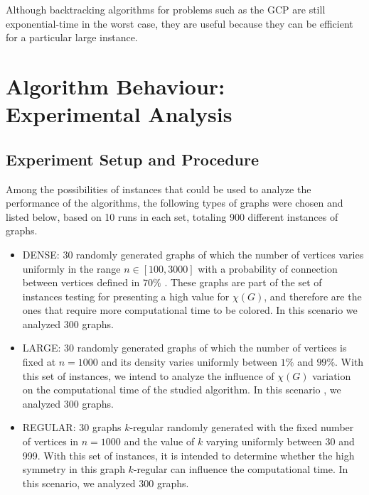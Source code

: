 \documentclass{article}
\begin{document}
Although backtracking algorithms for problems such as the GCP are still exponential-time in the worst case, they are useful because they can be efficient for a particular large instance.


\section{Algorithm Behaviour: Experimental Analysis}




\subsection{Experiment Setup and Procedure}

Among the possibilities of instances that could be used to analyze the performance of the algorithms, the following types of graphs were chosen and listed below, based on 10 runs in each set, totaling 900 different instances of graphs.



\begin{itemize}

\item DENSE:  30 randomly generated graphs of which the number of vertices varies uniformly in the range $ n \in [ 100 , 3000 ] $ with a probability of connection between vertices defined in $70\%$ . These graphs are part of the set of instances testing for presenting a high value for $\chi(G)$, and therefore are the ones that require more computational time to be colored. In this scenario we analyzed 300 graphs.
	
\item LARGE: 30 randomly generated graphs of which the number of vertices is fixed at $n = 1000$ and its density varies uniformly between $1\%$ and $99\%$. With this set of instances, we intend to analyze the influence of $\chi(G)$ variation on the computational time of the studied algorithm. In this scenario , we analyzed 300 graphs.
	
\item REGULAR: 30 graphs $k$-regular randomly generated  with the fixed number of vertices in $n = 1000$ and the value of $k$ varying uniformly between 30 and 999. With this set of instances, it is intended to determine whether the high symmetry in this graph $k$-regular can influence the computational time. In this scenario, we analyzed 300 graphs.

\end{itemize}
\end{document}
